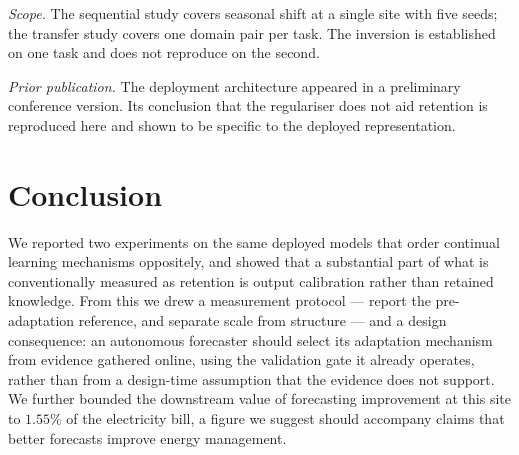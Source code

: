 \documentclass[journal]{IEEEtran}
\begin{document}
\emph{Scope.} The sequential study covers seasonal shift at a single site with
five seeds; the transfer study covers one domain pair per task. The inversion is
established on one task and does not reproduce on the second.

\emph{Prior publication.} The deployment architecture appeared in a preliminary
conference version. Its conclusion that the regulariser does not aid retention
is reproduced here and shown to be specific to the deployed representation.

\section{Conclusion}
\label{sec:conclusion}

We reported two experiments on the same deployed models that order continual
learning mechanisms oppositely, and showed that a substantial part of what is
conventionally measured as retention is output calibration rather than retained
knowledge. From this we drew a measurement protocol --- report the
pre-adaptation reference, and separate scale from structure --- and a design
consequence: an autonomous forecaster should select its adaptation mechanism
from evidence gathered online, using the validation gate it already operates,
rather than from a design-time assumption that the evidence does not support.
We further bounded the downstream value of forecasting improvement at this site
to $1.55\%$ of the electricity bill, a figure we suggest should accompany claims
that better forecasts improve energy management.



\end{document}
